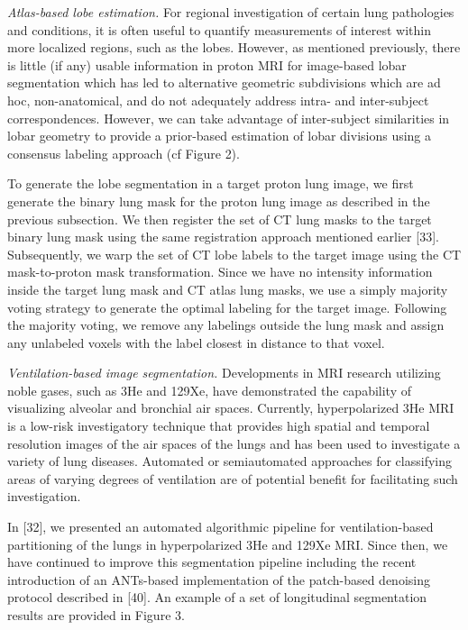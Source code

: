 \documentclass[11pt,]{article}
\begin{document}
\emph{Atlas-based lobe estimation.} For regional investigation of
certain lung pathologies and conditions, it is often useful to quantify
measurements of interest within more localized regions, such as the
lobes. However, as mentioned previously, there is little (if any) usable
information in proton MRI for image-based lobar segmentation which has
led to alternative geometric subdivisions which are ad hoc,
non-anatomical, and do not adequately address intra- and inter-subject
correspondences. However, we can take advantage of inter-subject
similarities in lobar geometry to provide a prior-based estimation of
lobar divisions using a consensus labeling approach (cf Figure 2).

To generate the lobe segmentation in a target proton lung image, we
first generate the binary lung mask for the proton lung image as
described in the previous subsection. We then register the set of CT
lung masks to the target binary lung mask using the same registration
approach mentioned earlier {[}33{]}. Subsequently, we warp the set of CT
lobe labels to the target image using the CT mask-to-proton mask
transformation. Since we have no intensity information inside the target
lung mask and CT atlas lung masks, we use a simply majority voting
strategy to generate the optimal labeling for the target image.
Following the majority voting, we remove any labelings outside the lung
mask and assign any unlabeled voxels with the label closest in distance
to that voxel.

\emph{Ventilation-based image segmentation.} Developments in MRI
research utilizing noble gases, such as 3He and 129Xe, have demonstrated
the capability of visualizing alveolar and bronchial air spaces.
Currently, hyperpolarized 3He MRI is a low-risk investigatory technique
that provides high spatial and temporal resolution images of the air
spaces of the lungs and has been used to investigate a variety of lung
diseases. Automated or semiautomated approaches for classifying areas of
varying degrees of ventilation are of potential benefit for facilitating
such investigation.

In {[}32{]}, we presented an automated algorithmic pipeline for
ventilation-based partitioning of the lungs in hyperpolarized 3He and
129Xe MRI. Since then, we have continued to improve this segmentation
pipeline including the recent introduction of an ANTs-based
implementation of the patch-based denoising protocol described in
{[}40{]}. An example of a set of longitudinal segmentation results are
provided in Figure 3.
\end{document}

